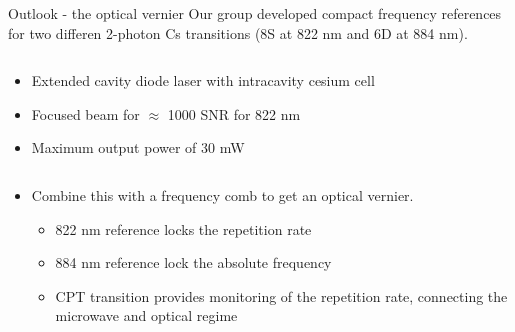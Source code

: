 \begin{block}{Outlook - the optical vernier}
  Our group developed compact frequency references for two differen 2-photon Cs transitions (8S at 822 nm and 6D at 884 nm).
  \begin{columns}
    \begin{column}{0.60\textwidth}
     \begin{itemize}
     \item Extended cavity diode laser with intracavity cesium cell
     \item Focused beam for $\approx$ 1000 SNR for 822 nm
     \item Maximum output power of 30 mW
     \end{itemize}
    \end{column}
    \begin{column}{0.39\textwidth}
      \begin{figure}
        \begin{center}
          \setlength\fboxsep{0pt}
          \setlength\fboxrule{0.5pt}
        \end{center}
      \end{figure}
    \end{column}
  \end{columns}
  \begin{columns}
    \begin{column}{0.60\textwidth}
     \begin{itemize}
     \item   Combine this with a frequency comb to get an optical vernier.
       \begin{itemize}
       \item 822 nm reference locks the repetition rate
       \item 884 nm reference lock the absolute frequency
       \item CPT transition provides monitoring of the repetition rate, connecting the microwave and optical regime

\end{itemize}
\end{itemize}
\end{column}
\end{columns}
\end{block}
